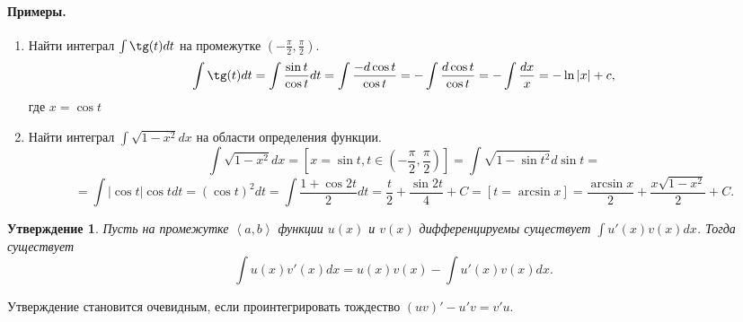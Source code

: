 \documentclass{article}
\theoremstyle{plain}
\newtheorem{claim}{Утверждение}
\theoremstyle{definition}
\theoremstyle{remark}
\renewcommand{\*}{\cdot}
\begin{document}
\paragraph{Примеры.}
\begin{enumerate}
\item Найти интеграл $\int \tg(t) dt$ на промежутке $(-\frac{\pi}{2}, \frac{\pi}{2}).$
\[\int \tg(t)dt = \int \frac{\sin{t}}{\cos{t}}dt = \int \frac{-d\cos{t}}{\cos{t}} = -\int \frac{d\cos{t}}{\cos{t}} = -\int \frac{dx}{x} = -\ln{|x|} + c,\] где $x = \cos{t}$

\item Найти интеграл $\int \sqrt{1 - x^2}dx$ на области определения функции.
\[\int \sqrt{1 - x^2}dx = [x = \sin{t}, t \in \left(-\frac{\pi}{2}, \frac{\pi}{2}\right)] = \int \sqrt{1 - \sin{t}^2}d\sin{t} =\]\[= \int |\cos{t}|\cos{t}dt = (\cos{t})^2dt = \int \frac{1 + \cos{2t}}{2}dt = \frac{t}{2} + \frac{\sin{2t}}{4} + C = [t = \arcsin{x}] = \frac{\arcsin{x}}{2} + \frac{x\sqrt{1 - x^2}}{2} + C.\]
\end{enumerate}
\begin{claim}\label{cl:partint} Пусть на промежутке $\left<a, b\right>$ функции $u(x)$ и $v(x)$ дифференцируемы существует $\int u'(x)v(x)dx$. Тогда существует \[\int u(x)v'(x)dx = u(x)v(x) - \int u'(x)v(x)dx.\]
\end{claim}
Утверждение становится очевидным, если проинтегрировать тождество $(uv)' - u'v = v'u.$
\end{document}
